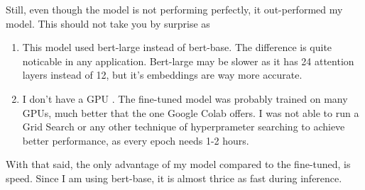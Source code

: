 \documentclass[12pt]{report}
\begin{document}
Still, even though the model is not performing perfectly, it out-performed my model.
This should not take you by surprise as
\begin{enumerate}
    \item This model used bert-large instead of bert-base. The difference is quite
        noticable in any application. Bert-large may be slower as it has 24 attention
        layers instead of 12, but it's embeddings are way more accurate.
    \item I don't have a GPU \smiley{}. The fine-tuned model was probably trained
        on many GPUs, much better that the one Google Colab offers. I was not able
        to run a Grid Search or any other technique of hyperprameter searching to
        achieve better performance, as every epoch needs 1-2 hours.
\end{enumerate}
With that said, the only advantage of my model compared to the fine-tuned, is speed.
Since I am using bert-base, it is almost thrice as fast during inference.
\end{document}
